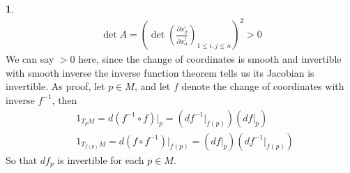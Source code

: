 \documentclass[10.5pt]{article}
\theoremstyle{definition}
\newtheorem{pb}{}
\begin{document}
\begin{pb}
\begin{align*}
            \det A = \left(\det \left(\frac{\partial x_\beta^i}{\partial x_\alpha^j} \right)_{1 \leq i,j \leq n}\right)^2 > 0
        \end{align*}
        We can say \(> 0\) here, since the change of coordinates is smooth and invertible with smooth inverse the inverse function theorem tells us its Jacobian is invertible. As proof, let \(p \in M\), and let \(f\) denote the change of coordinates with inverse \(f^{-1}\), then
        \begin{align*}
            &1_{T_pM} = d(f^{-1}\circ f)\vert_p = (df^{-1}\vert_{f(p)}) (df\vert_p) \\
            &1_{T_{f(p)}M} = d(f \circ f^{-1})\vert_{f(p)} = (df\vert_{p})(df^{-1}\vert_{f(p)})
        \end{align*}
        So that \(df_p\) is invertible for each \(p \in M\).
    \end{pb}
\end{document}
